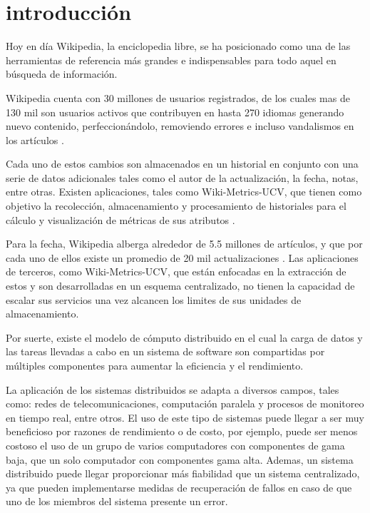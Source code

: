 \section*{introducción}

Hoy en día Wikipedia, la enciclopedia libre, se ha posicionado como una de las herramientas de
referencia más grandes e indispensables para todo aquel en búsqueda de información.

Wikipedia cuenta con 30 millones de usuarios registrados, de los cuales mas de 130 mil son
usuarios activos que contribuyen en hasta 270 idiomas generando nuevo contenido, perfeccionándolo,
removiendo errores e incluso vandalismos en los artículos \cite{1}.

Cada uno de estos cambios son almacenados en un historial en conjunto con una serie de datos
adicionales tales como el autor de la actualización, la fecha, notas, entre otras. Existen
aplicaciones, tales como Wiki-Metrics-UCV, que tienen como objetivo la recolección, almacenamiento
y procesamiento de historiales para el cálculo y visualización de métricas de sus atributos \cite{4}.

Para la fecha, Wikipedia alberga alrededor de 5.5 millones de artículos, y que
por cada uno de ellos existe un promedio de 20 mil actualizaciones \cite{2}. Las aplicaciones de terceros,
como Wiki-Metrics-UCV, que están enfocadas en la extracción de estos y son desarrolladas
en un esquema centralizado, no tienen la capacidad de escalar sus servicios una vez alcancen
los limites de sus unidades de almacenamiento.

Por suerte, existe el modelo de cómputo distribuido en el cual la carga de datos y las tareas llevadas a
cabo en un sistema de software son compartidas por múltiples componentes para aumentar la
eficiencia y el rendimiento.

La aplicación de los sistemas distribuidos se adapta a diversos campos, tales como:
redes de telecomunicaciones, computación paralela y procesos de monitoreo en tiempo
real, entre otros. El uso de este tipo de sistemas puede llegar a ser muy beneficioso por
razones de rendimiento o de costo, por ejemplo, puede ser menos costoso el uso de un grupo de varios
computadores con componentes de gama baja, que un solo computador con componentes gama alta. Ademas,
un sistema distribuido puede llegar proporcionar más fiabilidad que un sistema centralizado, ya
que pueden implementarse medidas de recuperación de fallos en caso de que uno de los miembros
del sistema presente un error.

